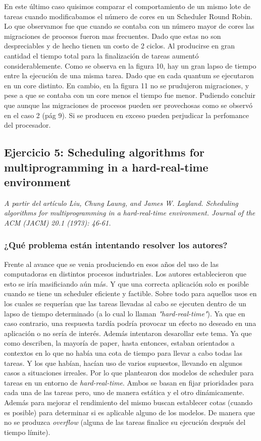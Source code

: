 \documentclass[a4paper]{article}
\begin{document}
 \bigskip

En este último caso quisimos comparar el comportamiento de un mismo lote de tareas cuando modificabamos el número de cores en un Scheduler Round Robin. Lo que observamos fue que cuando se contaba con un número mayor de cores las migraciones de procesos fueron mas frecuentes. Dado que estas no son despreciables y de hecho tienen un costo de 2 ciclos. Al producirse en gran cantidad el tiempo total para la finalización de tareas aumentó considerablemente. Como se observa en la figura 10, hay un gran lapso de tiempo entre la ejecución de una misma tarea. Dado que en cada quantum se ejecutaron en un core distinto. En cambio, en la figura 11 no se prudujeron migraciones, y pese a que se contaba con un core menos el tiempo fue menor. Pudiendo concluir que aunque las migraciones de procesos pueden ser provechosas como se observó en el caso 2 (pág 9). Si se producen en exceso pueden perjudicar la perfomance del procesador.  

\newpage

 \subsection{Ejercicio 5: Scheduling algorithms for multiprogramming in a hard-real-time environment}
 
\textit{A partir del art\'iculo Liu, Chung Laung, and James W. Layland. Scheduling algorithms for multiprogramming in a hard-real-time environment. Journal of the ACM (JACM) 20.1 (1973): 46-61.}


\subsubsection{¿Qu\'e problema est\'an intentando resolver los autores?}

Frente al avance que se venia produciendo en esos años del uso de las computadoras en distintos procesos industriales. Los autores establecieron que esto se iría masificiando aún más. Y que una correcta aplicación solo es posible cuando se tiene un scheduler eficiente y factible. Sobre todo para aquellos usos en los cuales se requerían que las tareas llevadas al cabo se ejecuten dentro de un lapso de tiempo determinado (a lo cual lo llaman \textit{"hard-real-time"}). Ya que en caso contrario, una respuesta tardía podría provocar un efecto no deseado en una aplicación o no sería de interés. Además intentaron desarollar este tema. Ya que como describen, la mayoría de paper, hasta entonces, estaban orientados a contextos en lo que no había una cota de tiempo para llevar a cabo todas las tareas. Y los que habían, hacían uso de varios supuestos, llevando en algunos casos a situaciones irreales. Por lo que plantearon dos modelos de scheduler para tareas en un entorno de \textit{hard-real-time}. Ambos se basan en fijar prioridades para cada una de las tareas pero, uno de manera estática y el otro dinámicamente. Además para mejorar el rendimiento del mismo buscan establecer cotas (cuando es posible) para determinar si es aplicable alguno de los modelos. De manera que no se produzca \textit{overflow} (alguna de las tareas finalice su ejecución después del tiempo límite).
\end{document}
